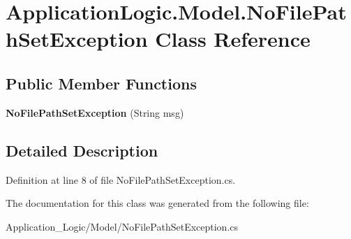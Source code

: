 \hypertarget{class_application_logic_1_1_model_1_1_no_file_path_set_exception}{
\section{ApplicationLogic.Model.NoFilePathSetException Class Reference}
\label{class_application_logic_1_1_model_1_1_no_file_path_set_exception}
}
\subsection*{Public Member Functions}
\begin{DoxyCompactItemize}
\item 
\hypertarget{class_application_logic_1_1_model_1_1_no_file_path_set_exception_ae1fd7df56735f6871c53b8cf420bd080}{
{\bfseries NoFilePathSetException} (String msg)}
\label{class_application_logic_1_1_model_1_1_no_file_path_set_exception_ae1fd7df56735f6871c53b8cf420bd080}

\end{DoxyCompactItemize}


\subsection{Detailed Description}


Definition at line 8 of file NoFilePathSetException.cs.



The documentation for this class was generated from the following file:\begin{DoxyCompactItemize}
\item 
Application\_\-Logic/Model/NoFilePathSetException.cs\end{DoxyCompactItemize}
